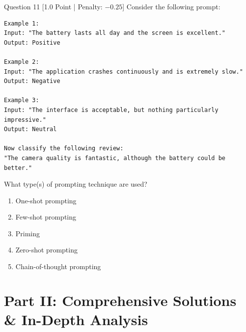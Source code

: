 \documentclass[11pt,a4paper]{article}
\begin{document}
\vspace{0.3cm}

\begin{questionbox}{Question 11 \hfill [1.0 Point | Penalty: $-0.25$]}
Consider the following prompt:
\begin{lstlisting}[style=promptstyle]
Example 1:
Input: "The battery lasts all day and the screen is excellent."
Output: Positive

Example 2:
Input: "The application crashes continuously and is extremely slow."
Output: Negative

Example 3:
Input: "The interface is acceptable, but nothing particularly impressive."
Output: Neutral

Now classify the following review:
"The camera quality is fantastic, although the battery could be better."
\end{lstlisting}

What type(s) of prompting technique are used?
\begin{enumerate}[label=\alph*.,leftmargin=2em,itemsep=2pt]
    \item One-shot prompting
    \item Few-shot prompting
    \item Priming
    \item Zero-shot prompting
    \item Chain-of-thought prompting
\end{enumerate}
\end{questionbox}

\newpage

\section{Part II: Comprehensive Solutions \& In-Depth Analysis}
\end{document}
